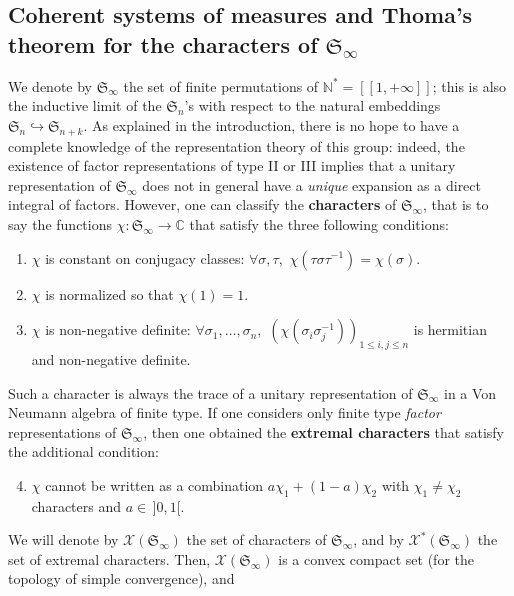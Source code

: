\documentclass[smallextended,nospthms]{svjour3}
\theoremstyle{remark}
\newcommand{\N}{\mathbb{N}}
\newcommand{\C}{\mathbb{C}}
\newcommand{\sym}{\mathfrak{S}}
\newcommand{\lle}{\left[\!\left[}
\newcommand{\rre}{\right]\!\right]}
\begin{document}
\subsection{Coherent systems of measures and Thoma's theorem for the characters of $\sym_{\infty}$}
 We denote by $\sym_{\infty}$ the set of finite permutations of $\N^{*}=\lle 1,+\infty\rre$; this is also the inductive limit of the $\sym_{n}$'s with respect to the natural embeddings $\sym_{n}\hookrightarrow \sym_{n+k}$. As explained in the introduction, there is no hope to have a complete knowledge of the representation theory of this group: indeed, the existence of factor representations of type II or III implies that a unitary representation of $\sym_{\infty}$ does not in general have a \emph{unique} expansion as a direct integral of factors. However, one can classify the \textbf{characters} of $\sym_{\infty}$, that is to say the functions $\chi : \sym_{\infty} \to \C$ that satisfy the three following conditions:\vspace{2mm}
\begin{enumerate}
\item $\chi$ is constant on conjugacy classes: $\forall \sigma,\tau,\,\,\chi(\tau\sigma\tau^{-1})=\chi(\sigma)$.\vspace{2mm}
\item $\chi$ is normalized so that $\chi(1)=1$. \vspace{2mm}
\item $\chi$ is non-negative definite: $\forall \sigma_{1},\ldots,\sigma_{n},\,\,(\chi(\sigma_{i}\sigma_{j}^{-1}))_{1\leq i,j \leq n}$ is hermitian and non-negative definite.\vspace{2mm}
\end{enumerate} 
Such a character is always the trace of a unitary representation of $\sym_{\infty}$ in a Von Neumann algebra of finite type. If one considers only finite type \emph{factor} representations of $\sym_{\infty}$, then one obtained the \textbf{extremal characters} that satisfy the additional condition:\vspace{2mm}
\begin{enumerate}
\setcounter{enumi}{3}
\item $\chi$ cannot be written as a combination $a\chi_{1}+(1-a)\chi_{2}$ with $\chi_{1}\neq \chi_{2}$ characters and $a \in\, ]0,1[$.\vspace{2mm}
\end{enumerate}
We will denote by $\mathcal{X}(\sym_{\infty})$ the set of characters of $\sym_{\infty}$, and by $\mathcal{X}^{*}(\sym_{\infty})$ the set of extremal characters. Then, $\mathcal{X}(\sym_{\infty})$ is a convex compact set (for the topology of simple convergence), and 
\end{document}
